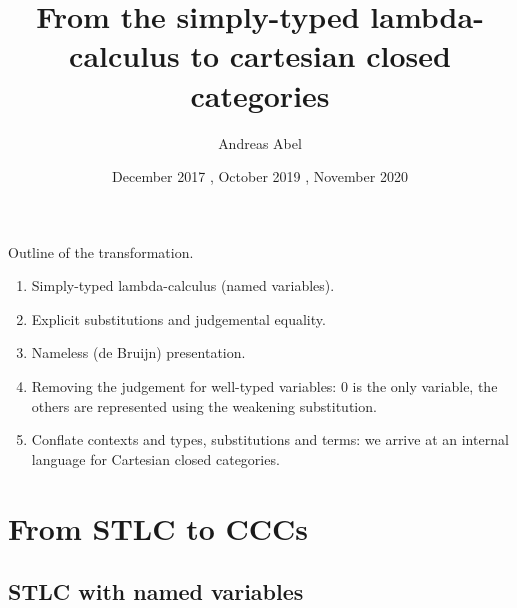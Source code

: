 \documentclass[a4paper,fleqn]{scrartcl}
\title{From the simply-typed lambda-calculus to
  cartesian closed categories}
\author{Andreas Abel}
\date{ December 2017%
     , October  2019%
     , November 2020%
     }
\begin{document}
\maketitle

Outline of the transformation.
\begin{enumerate}
\item Simply-typed lambda-calculus (named variables).
\item Explicit substitutions and judgemental equality.
\item Nameless (de Bruijn) presentation.
\item Removing the judgement for well-typed variables: $0$ is the only
  variable, the others are represented using the weakening
  substitution.
\item Conflate contexts and types, substitutions and terms: we arrive
  at an internal language for Cartesian closed categories.
\end{enumerate}

\section{From STLC to CCCs}

\subsection{STLC with named variables}
\end{document}
